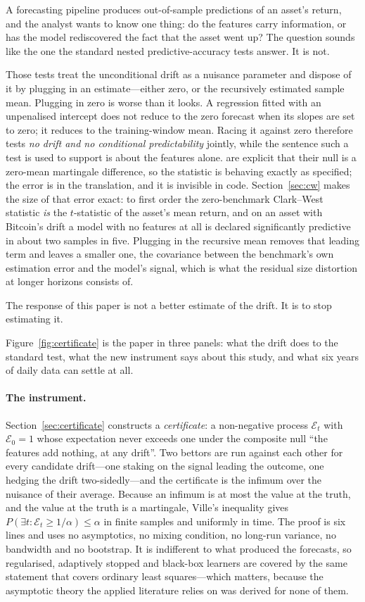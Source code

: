 \documentclass{article}
\theoremstyle{plain}
\theoremstyle{definition}
\begin{document}
A forecasting pipeline produces out-of-sample predictions of an asset's return, and the
analyst wants to know one thing: do the features carry information, or has the model
rediscovered the fact that the asset went up? The question sounds like the one the standard
nested predictive-accuracy tests answer. It is not.

Those tests treat the unconditional drift as a nuisance parameter and dispose of it by
plugging in an estimate---either zero, or the recursively estimated sample mean. Plugging in
zero is worse than it looks. A regression fitted with an unpenalised intercept does not
reduce to the zero forecast when its slopes are set to zero; it reduces to the
training-window mean. Racing it against zero therefore tests \emph{no drift and no
conditional predictability} jointly, while the sentence such a test is used to support is
about the features alone. \citet{clark2006} are explicit that their null is a zero-mean
martingale difference, so the statistic is behaving exactly as specified; the error is in
the translation, and it is invisible in code. Section~\ref{sec:cw} makes the size of that
error exact: to first order the zero-benchmark Clark--West statistic \emph{is} the
$t$-statistic of the asset's mean return, and on an asset with Bitcoin's drift a model with
no features at all is declared significantly predictive in about two samples in five.
Plugging in the recursive mean removes that leading term and leaves a smaller one, the
covariance between the benchmark's own estimation error and the model's signal, which is
what the residual size distortion at longer horizons consists of.

The response of this paper is not a better estimate of the drift. It is to stop estimating
it.

Figure~\ref{fig:certificate} is the paper in three panels: what the drift does to the
standard test, what the new instrument says about this study, and what six years of daily
data can settle at all.

\paragraph{The instrument.} Section~\ref{sec:certificate} constructs a \emph{certificate}: a
non-negative process $\mathcal{E}_t$ with $\mathcal{E}_0=1$ whose expectation never exceeds
one under the composite null ``the features add nothing, at any drift''. Two bettors are run
against each other for every candidate drift---one staking on the signal leading the
outcome, one hedging the drift two-sidedly---and the certificate is the infimum over the
nuisance of their average. Because an infimum is at most the value at the truth, and the
value at the truth is a martingale, Ville's inequality gives
$P(\exists t:\mathcal{E}_t\ge1/\alpha)\le\alpha$ in finite samples and uniformly in time.
The proof is six lines and uses no asymptotics, no mixing condition, no long-run variance,
no bandwidth and no bootstrap. It is indifferent to what produced the forecasts, so
regularised, adaptively stopped and black-box learners are covered by the same statement
that covers ordinary least squares---which matters, because the asymptotic theory the
applied literature relies on was derived for none of them.
\end{document}
